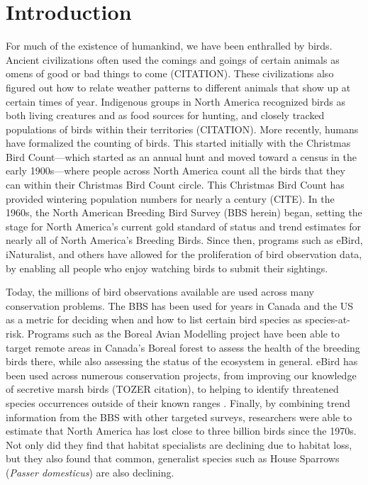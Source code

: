 \chapter{Introduction}

\par For much of the existence of humankind, we have been enthralled by birds.
Ancient civilizations often used the comings and goings of certain animals as omens of good or bad things to come (CITATION).
These civilizations also figured out how to relate weather patterns to different animals that show up at certain times of year.
Indigenous groups in North America recognized birds as both living creatures and as food sources for hunting, and closely tracked populations of birds within their territories (CITATION).
More recently, humans have formalized the counting of birds.
This started initially with the Christmas Bird Count---which started as an annual hunt and moved toward a census in the early 1900s---where people across North America count all the birds that they can within their Christmas Bird Count circle.
This Christmas Bird Count has provided wintering population numbers for nearly a century (CITE).
In the 1960s, the North American Breeding Bird Survey (BBS herein) began, setting the stage for North America's current gold standard of status and trend estimates for nearly all of North America's Breeding Birds.
Since then, programs such as eBird, iNaturalist, and others have allowed for the proliferation of bird observation data, by enabling all people who enjoy watching birds to submit their sightings.

\par Today, the millions of bird observations available are used across many conservation problems.
The BBS has been used for years in Canada and the US as a metric for deciding when and how to list certain bird species as species-at-risk.
Programs such as the Boreal Avian Modelling project have been able to target remote areas in Canada's Boreal forest to assess the health of the breeding birds there, while also assessing the status of the ecosystem in general.
eBird has been used across numerous conservation projects, from improving our knowledge of secretive marsh birds (TOZER citation), to helping to identify threatened species occurrences outside of their known ranges \citep{lin_using_2022}.
Finally, by combining trend information from the BBS with other targeted surveys, researchers were able to estimate that North America has lost close to three billion birds since the 1970s.
Not only did they find that habitat specialists are declining due to habitat loss, but they also found that common, generalist species such as House Sparrows (\textit{Passer domesticus}) are also declining.

